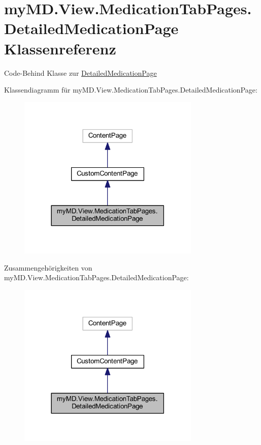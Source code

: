 \hypertarget{classmy_m_d_1_1_view_1_1_medication_tab_pages_1_1_detailed_medication_page}{}\section{my\+M\+D.\+View.\+Medication\+Tab\+Pages.\+Detailed\+Medication\+Page Klassenreferenz}
\label{classmy_m_d_1_1_view_1_1_medication_tab_pages_1_1_detailed_medication_page}


Code-\/\+Behind Klasse zur \mbox{\hyperlink{classmy_m_d_1_1_view_1_1_medication_tab_pages_1_1_detailed_medication_page}{Detailed\+Medication\+Page}}  




Klassendiagramm für my\+M\+D.\+View.\+Medication\+Tab\+Pages.\+Detailed\+Medication\+Page\+:\nopagebreak
\begin{figure}[H]
\begin{center}
\leavevmode
\includegraphics[width=246pt]{classmy_m_d_1_1_view_1_1_medication_tab_pages_1_1_detailed_medication_page__inherit__graph}
\end{center}
\end{figure}


Zusammengehörigkeiten von my\+M\+D.\+View.\+Medication\+Tab\+Pages.\+Detailed\+Medication\+Page\+:\nopagebreak
\begin{figure}[H]
\begin{center}
\leavevmode
\includegraphics[width=246pt]{classmy_m_d_1_1_view_1_1_medication_tab_pages_1_1_detailed_medication_page__coll__graph}
\end{center}
\end{figure}
